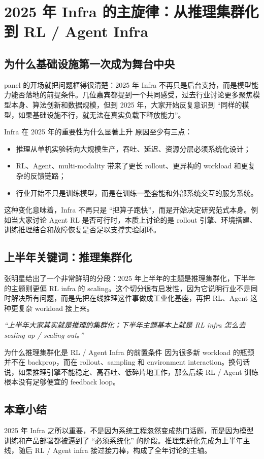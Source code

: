 \section{2025 年 Infra 的主旋律：从推理集群化到 RL / Agent Infra}

\subsection{为什么基础设施第一次成为舞台中央}
panel 的开场就把问题框得很清楚：2025 年 Infra 不再只是后台支持，而是模型能力能否落地的前提条件。几位嘉宾都提到一个共同感受，过去行业讨论更多聚焦模型本身、算法创新和数据规模，但到 2025 年，大家开始反复意识到 ``同样的模型，如果基础设施不行，就无法在真实负载下释放能力''。

\begin{importantbox}{Infra 在 2025 年的重要性为什么显著上升}
原因至少有三点：
\begin{itemize}
  \item 推理从单机实验转向大规模生产，吞吐、延迟、资源分层必须系统化设计；
  \item RL、Agent、multi-modality 带来了更长 rollout、更异构的 workload 和更复杂的反馈链路；
  \item 行业开始不只是训练模型，而是在训练一整套能和外部系统交互的服务系统。
\end{itemize}
\end{importantbox}

这种变化意味着，Infra 不再只是 ``把算子跑快''，而是开始决定研究范式本身。例如当大家讨论 Agent RL 是否可行时，本质上讨论的是 rollout 引擎、环境搭建、训练推理结合和故障恢复是否足以支撑实验闭环。

\subsection{上半年关键词：推理集群化}
张明星给出了一个非常鲜明的分段：2025 年上半年的主题是推理集群化，下半年的主题则更偏 RL infra 的 scaling。这个切分很有启发性，因为它说明行业不是同时解决所有问题，而是先把在线推理这件事做成工业化基座，再把 RL、Agent 这种更复杂 workload 接上来。

\textit{``上半年大家其实就是推理的集群化；下半年主题基本上就是 RL infra 怎么去 scaling up / scaling out。''}

\begin{knowledgebox}{为什么推理集群化是 RL / Agent Infra 的前置条件}
因为很多新 workload 的瓶颈并不在 backprop，而在 rollout、sampling 和 environment interaction。换句话说，如果推理引擎不能稳定、高吞吐、低碎片地工作，那么后续 RL / Agent 训练根本没有足够便宜的 feedback loop。
\end{knowledgebox}

\subsection{本章小结}
2025 年 Infra 之所以重要，不是因为系统工程忽然变成热门话题，而是因为模型训练和产品部署都被逼到了 ``必须系统化'' 的阶段。推理集群化先成为上半年主线，随后 RL / Agent infra 接过接力棒，构成了全年讨论的主轴。

